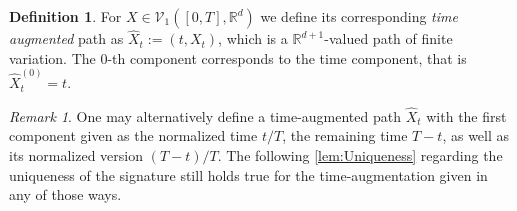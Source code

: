 \documentclass[
    a4paper,
    11pt,
    bibliography=totoc,
    listof=totoc,      
    headinclude=true,
    cleardoublepage=empty,
]{scrbook}
\theoremstyle{plain}
\theoremstyle{definition}
\newtheorem{definition}[theorem]{Definition}
\theoremstyle{remark}
\newtheorem{remark}[theorem]{Remark}
\newcommand{\SetR}{\mathbb R}
\begin{document}
\begin{definition}
\label{def:TimeAugmentedPath}
    For $X\in\mathcal{V}_1([0,T],\SetR^d)$ we define its corresponding
    \textit{time augmented} path as $\widehat{X}_t := (t, X_t)$, which is a
    $\SetR^{d+1}$-valued path of finite variation. The $0$-th component 
    corresponds to the time component, that is $\widehat X^{(0)}_t = t$.
\end{definition}

\begin{remark}
    One may alternatively define a time-augmented path $\widehat{X}_t$ with
    the first component given as the normalized time $t/T$, the remaining time
    $T-t$, as well as its normalized version $(T-t)/T$. The following
    \cref{lem:Uniqueness} regarding the uniqueness of the signature still
    holds true for the time-augmentation given in any of those ways.
\end{remark}
\end{document}
